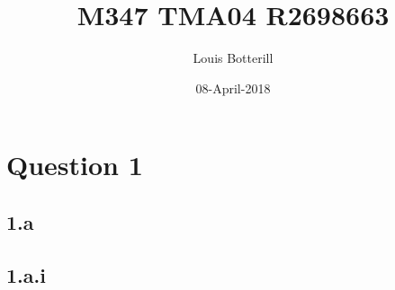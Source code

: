 \documentclass[11pt]{article}   	%
\title{M347 TMA04 R2698663}
\author{Louis Botterill}
\date{08-April-2018}					%
\begin{document}
\maketitle

\pagebreak

\section*{Question 1}

\subsection*{1.a}
\subsection*{1.a.i}
\end{document}
